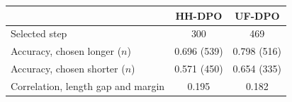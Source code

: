 \begin{tabular}{l c c}
\toprule
 & HH-DPO & UF-DPO \\
\midrule
Selected step & 300 & 469 \\
Accuracy, chosen longer ($n$) & 0.696 (539) & 0.798 (516) \\
Accuracy, chosen shorter ($n$) & 0.571 (450) & 0.654 (335) \\
Correlation, length gap and margin & 0.195 & 0.182 \\
\bottomrule
\end{tabular}
